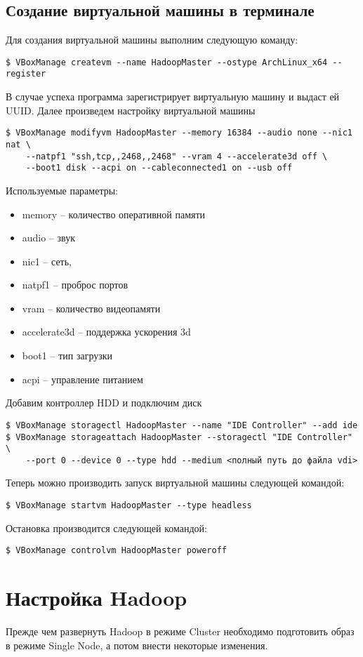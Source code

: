 \section{Создание виртуальной машины в терминале}
Для создания виртуальной машины выполним следующую команду:
\begin{lstlisting}
$ VBoxManage createvm --name HadoopMaster --ostype ArchLinux_x64 --register
\end{lstlisting}
В случае успеха программа зарегистрирует виртуальную машину и выдаст ей UUID. Далее произведем настройку 
виртуальной машины
\begin{lstlisting}
$ VBoxManage modifyvm HadoopMaster --memory 16384 --audio none --nic1 nat \
    --natpf1 "ssh,tcp,,2468,,2468" --vram 4 --accelerate3d off \
    --boot1 disk --acpi on --cableconnected1 on --usb off
\end{lstlisting}
Используемые параметры:
\begin{itemize}
    \item memory -- количество оперативной памяти
    \item audio -- звук
    \item nic1 -- сеть, 
    \item natpf1 -- проброс портов
    \item vram -- количество видеопамяти
    \item accelerate3d -- поддержка ускорения 3d
    \item boot1 -- тип загрузки
    \item acpi -- управление питанием
\end{itemize}
Добавим контроллер HDD и подключим диск
\begin{lstlisting}
$ VBoxManage storagectl HadoopMaster --name "IDE Controller" --add ide
$ VBoxManage storageattach HadoopMaster --storagectl "IDE Controller" \
    --port 0 --device 0 --type hdd --medium <полный путь до файла vdi>
\end{lstlisting}
Теперь можно производить запуск виртуальной машины следующей командой:
\begin{lstlisting}
$ VBoxManage startvm HadoopMaster --type headless
\end{lstlisting}
Остановка производится следующей командой:
\begin{lstlisting}
$ VBoxManage controlvm HadoopMaster poweroff
\end{lstlisting}

\chapter{Настройка Hadoop}
Прежде чем развернуть Hadoop в режиме Cluster необходимо подготовить образ в режиме Single Node, а потом 
внести некоторые изменения.

